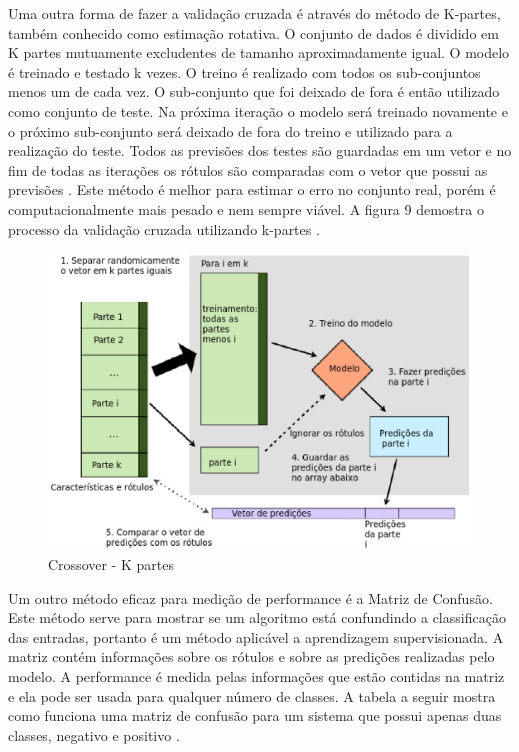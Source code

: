 Uma outra forma de fazer a validação cruzada é através do método de K-partes, também conhecido como estimação rotativa. O conjunto de dados é dividido em K partes mutuamente excludentes de tamanho aproximadamente igual. O modelo é treinado e testado k vezes. O treino é realizado com todos os sub-conjuntos menos um de cada vez. O sub-conjunto que foi deixado de fora é então utilizado como conjunto de teste. Na próxima iteração o modelo será treinado novamente e o próximo sub-conjunto será deixado de fora do treino e utilizado para a realização do teste. Todos as previsões dos testes são guardadas em um vetor e no fim de todas as iterações os rótulos são comparadas com o vetor que possui as previsões \cite{astudy1995}. Este método  é melhor para estimar o erro no conjunto real, porém é computacionalmente mais pesado e nem sempre viável. A figura 9 demostra o processo da validação cruzada utilizando k-partes \cite{real2013}.

\begin{figure}[!h]
\centering
\includegraphics[keepaspectratio=true,scale=0.60]
{figuras/kfolds.eps}
\caption{Crossover - K partes}
\label{over}
\end{figure}

Um outro método eficaz para medição de performance é a Matriz de Confusão. Este método serve para mostrar se um algoritmo está confundindo a classificação das entradas, portanto é um método aplicável a aprendizagem supervisionada. A matriz contém informações sobre os rótulos e sobre as predições realizadas pelo modelo. A performance é medida pelas informações que estão contidas na matriz e ela pode ser usada para qualquer número de classes. A tabela a seguir mostra como funciona uma matriz de confusão para um sistema que possui apenas duas classes, negativo e positivo \cite{howard2012}. 

